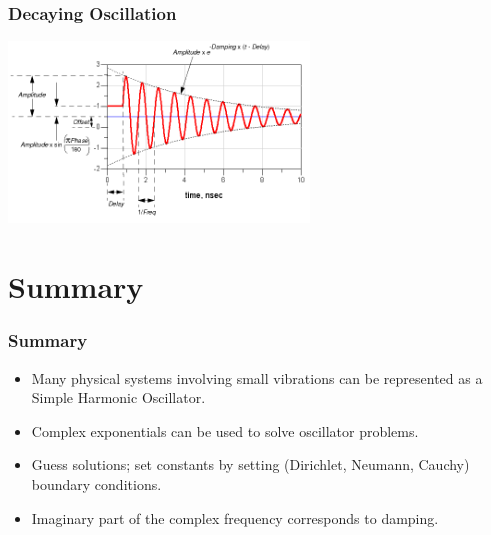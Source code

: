 \documentclass[pdf,hideothersubsections]{beamer}
\begin{document}
\begin{frame}
\frametitle{Decaying Oscillation}

\centering
\includegraphics[width=8cm]{damped_sine.png}

\end{frame}

\section{Summary}
\begin{frame}
\frametitle{Summary}
\begin{itemize}
\item Many physical systems involving small vibrations can be represented as a Simple Harmonic Oscillator.
\pause
\item Complex exponentials can be used to solve oscillator problems.
\pause
\item Guess solutions; set constants by setting (Dirichlet, Neumann, Cauchy) boundary conditions.
\pause
\item Imaginary part of the complex frequency corresponds to damping.
\end{itemize}
\end{frame}
\end{document}

